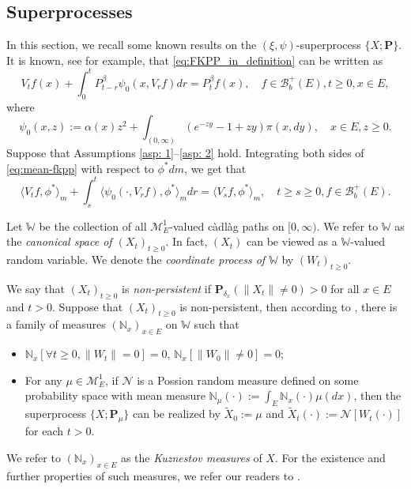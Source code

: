 \documentclass[12pt, a4paper]{amsart}
\theoremstyle{definition}
\numberwithin{equation}{section}
\begin{document}
\subsection{Superprocesses}
\label{sec: Superprocesses}
	In this section, we recall some known results on the $(\xi, \psi)$-superprocess $\{X; \mathbf P\}$.
	It is known, see \cite[Theorem 2.23]{Li2011Measure-valued} for example, that \eqref{eq:FKPP_in_definition} can be written as
\[\label{eq:mean-fkpp}
	V_t f(x) + \int_0^t P^\beta_{t-r} \psi_0(x,V_r f) dr
	= P^\beta_t f(x),
	\quad f \in \mathscr B^+_b(E), t \geq 0,x \in E,
\]
	where
\[
	\psi_0(x,z)
	:= \alpha(x) z^2 + \int_{(0,\infty)} (e^{-z y} - 1 + z y) \pi(x,dy),
	\quad x \in E,z \geq 0.
\]
    Suppose that Assumptions \ref{asp: 1}--\ref{asp: 2} hold.
    Integrating both sides of \eqref{eq:mean-fkpp}  with respect to  $\phi^*dm$, we get that
\[\label{eq:langleVtfphiranglem_equation}
	\langle V_tf,\phi^*\rangle_m + \int_s^t \langle \psi_0(\cdot ,V_r f) , \phi^*\rangle_mdr
	= \langle V_sf,\phi^*\rangle_m,
	\quad t\geq s\geq 0, f\in \mathscr B^+_b(E).
\]

	Let $\mathbb W$ be the collection of all $\mathcal M^1_E$-valued 
 c\`{a}dl\`{a}g 
paths on $[0,\infty)$.
	We refer to $\mathbb W$ as the
	\emph{canonical space of
    $(X_t)_{t\geq 0}$}.
	In fact, $(X_t)$ can be viewed
	as a $\mathbb W$-valued random variable.
	We denote the \emph{coordinate process of $\mathbb W$} by $(W_t)_{t\geq 0}$.

	We say that 
    $(X_t)_{t\geq 0}$ 
is \emph{non-persistent}
	if $\mathbf P_{\delta_x}(\|X_t\|\neq 0) > 0$ for all $x\in E$ and $t> 0$.
	Suppose that $(X_t)_{t\geq 0}$ is non-persistent,
	then according to \cite[Section 8]{Li2011Measure-valued}, there is a family of measures $(\mathbb N_x)_{x\in E}$ on $\mathbb W$ such that
\begin{itemize}
	\item
	$\mathbb N_x [ \forall t \geq 0, \|W_t\|=0] =0$, $\mathbb N_x[\|W_0 \|\neq 0] = 0$;
	\item
	For any $\mu \in \mathcal M_E^1$, if $\mathcal N$ is a Possion random
	measure defined on some
	probability space with mean measure $\mathbb N_\mu(\cdot):= \int_E \mathbb N_x(\cdot )\mu(dx)$,
	then the superprocess $\{X;\mathbf P_\mu\}$ can be realized by $\widetilde X_0 := \mu$ and $\widetilde X_t(\cdot) := \mathcal N[W_t(\cdot)]$ for each $t>0$.
\end{itemize}
	We refer to $(\mathbb N_x)_{x\in E}$ as the \emph{Kuznestov measures} of $X$.
	For the existence and further properties of such measures, we refer our readers to \cite{Li2011Measure-valued}.
\end{document}
